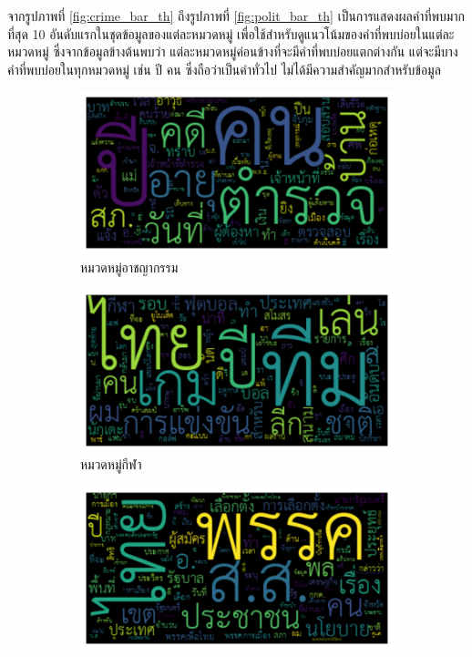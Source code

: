 \documentclass[12pt,oneside,openright,a4paper]{cpe-thai-project}
\begin{document}
\begin{itemize}
        \hspace{1cm}จากรูปภาพที่ \ref{fig:crime_bar_th} ถึงรูปภาพที่ \ref{fig:polit_bar_th} เป็นการแสดงผลคำที่พบมากที่สุด 10 อันดับแรกในชุดข้อมูลของแต่ละหมวดหมู่
        เพื่อใช้สำหรับดูแนวโน้มของคำที่พบบ่อยในแต่ละหมวดหมู่ ซึ่งจากข้อมูลข้างต้นพบว่า แต่ละหมวดหมู่ค่อนข้างที่จะมีคำที่พบบ่อยแตกต่างกัน แต่จะมีบางคำที่พบบ่อยในทุกหมวดหมู่
        เช่น ปี คน ซึ่งถือว่าเป็นคำทั่วไป ไม่ได้มีความสำคัญมากสำหรับข้อมูล 
        \begin{figure}[!ht]\centering
          \begin{subfigure}{0.49\textwidth}
            \includegraphics[width=\linewidth]{./img/thai_stat/crime_wc.png} 
            \caption{หมวดหมู่อาชญากรรม}
            \label{fig:subim_th1}
          \end{subfigure}
          \begin{subfigure}{0.49\textwidth}
            \includegraphics[width=\linewidth]{./img/thai_stat/sport_wc.png}
            \caption{หมวดหมู่กีฬา}
            \label{fig:subim_th2}
          \end{subfigure}
          \begin{subfigure}{0.49\textwidth}
            \includegraphics[width=\linewidth]{./img/thai_stat/polit_wc.png}

\end{subfigure}
\end{figure}
\end{itemize}
\end{document}
